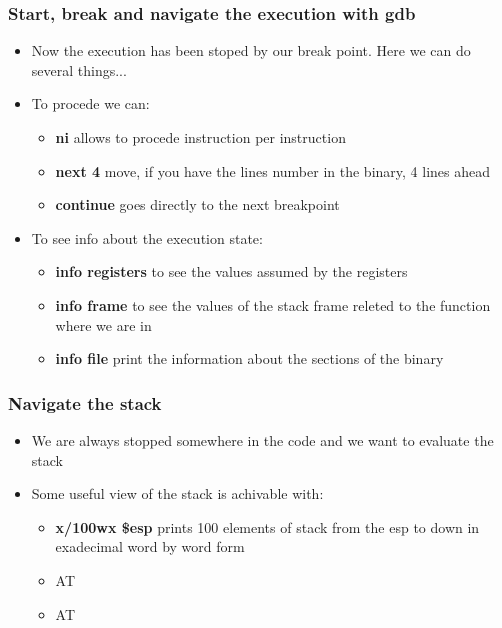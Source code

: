 \documentclass[]{beamer}
\begin{document}
      \begin{frame}
        \frametitle{Start, break and navigate the execution with gdb}
        \begin{itemize}
            \item{Now the execution has been stoped by our break point. Here we can do several things...}
            \item{To procede we can:}
            \begin{itemize}
                \item{{\bf ni} allows to procede instruction per instruction}
                \item{{\bf next 4} move, if you have the lines number in the binary, 4 lines ahead}
                \item{{\bf continue} goes directly to the next breakpoint}
            \end{itemize}
            \item{To see info about the execution state:}
            \begin{itemize}
                \item{{\bf info registers} to see the values assumed by the registers}
                \item{{\bf info frame} to see the values of the stack frame releted to the function where we are in}
                \item{{\bf info file} print the information about the sections of the binary}
            \end{itemize}
        \end{itemize}
      \end{frame}
      \begin{frame}
        \frametitle{Navigate the stack}
        \begin{itemize}
            \item{We are always stopped somewhere in the code and we want to evaluate the stack}
            \item{Some useful view of the stack is achivable with:}
            \begin{itemize}
               \item{{\bf x/100wx \$esp} prints 100 elements of stack from the esp to down in exadecimal word by word form}
               \item{AT}
               \item{AT}
            \end{itemize}
        \end{itemize}
      \end{frame}
\end{document}
